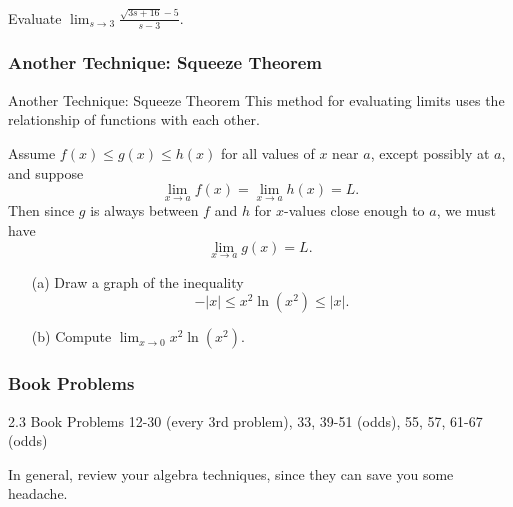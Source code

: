 \documentclass[cal1spr16Lectures.tex]{subfiles}
\begin{document}
\begin{frame}
\begin{exe}
Evaluate $\lim_{s\to 3}\frac{\sqrt{3s+16}-5}{s-3}$.
\end{exe}
\end{frame}

\subsubsection{Another Technique: Squeeze Theorem}
\begin{frame}{\small Another Technique: Squeeze Theorem}
This method for evaluating limits uses the relationship of functions with each other.

\begin{thm}\footnotesize  Assume $f(x)\leq g(x)\leq h(x)$ for all values of $x$ near $a$, except possibly at $a$, and suppose
\[\lim_{x \to a}f(x)=\lim_{x \to a} h(x)=L.\] 
Then since $g$ is always between $f$ and $h$ for $x$-values close enough to $a$, we must have 
\[\lim_{x \to a} g(x)=L.\] \end{thm}
\end{frame}

\begin{frame}
\begin{ex} \begin{itemize}
\item[(a)]Draw a graph of the inequality 
\[-|x| \leq x^2 \ln{(x^2)} \leq |x|.\]

\vspace{0.5pc}
\item[(b)] Compute $\lim_{x \to 0} x^2 \ln{(x^2)}.$
\end{itemize}
\end{ex}
\end{frame}

\subsubsection{Book Problems}
\begin{frame}
\begin{block}{2.3 Book Problems} 12-30 (every 3rd problem), 33, 39-51 (odds), 55, 57, 61-67 (odds) \end{block}
In general, review your algebra techniques, since they can save you some headache.
\end{frame}
\end{document}
